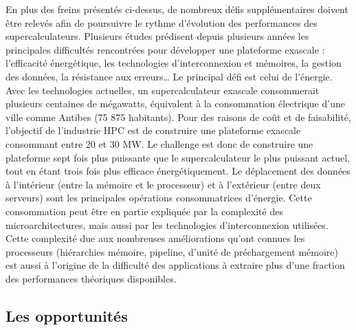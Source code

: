         En plus des freins présentés ci-dessus, de nombreux défis supplémentaires doivent être relevés afin de poursuivre le rythme d'évolution des performances des supercalculateurs. Plusieurs études \cite{Sutter2005b, bergman2008exascale, Lucas2014, HPE2016} prédisent depuis plusieurs années les principales difficultés rencontrées pour développer une plateforme exascale : l'efficacité énergétique, les technologies d'interconnexion et mémoires, la gestion des données, la résistance aux erreurs… 
        Le principal défi est celui de l'énergie. Avec les technologies actuelles, un supercalculateur exascale consommerait plusieurs centaines de mégawatts, équivalent à la consommation électrique d'une ville comme Antibes (75 875 habitants). Pour des raisons de coût et de faisabilité, l'objectif de l'industrie HPC est de construire une plateforme exascale consommant entre 20 et 30 MW. Le challenge est donc de construire une plateforme sept fois plus puissante que le supercalculateur le plus puissant actuel, tout en étant trois fois plus efficace énergétiquement. Le déplacement des données à l'intérieur (entre la mémoire et le processeur) et à l'extérieur (entre deux serveurs) sont les principales opérations consommatrices d'énergie. Cette consommation peut être en partie expliquée par la complexité des microarchitectures, mais aussi par les technologies d'interconnexion utilisées. Cette complexité due aux nombreuses améliorations qu'ont connues les processeurs (hiérarchies mémoire, pipeline, d'unité de préchargement mémoire) est aussi à l'origine de la difficulté des applications à extraire plus d'une fraction des performances théoriques disponibles.
        

    \subsection{Les opportunités}


